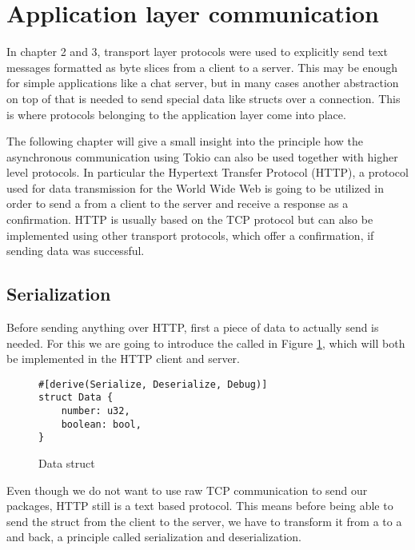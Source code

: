 
\section{Application layer communication}
In chapter 2 and 3, transport layer protocols were used to explicitly send text messages formatted as byte slices from
a client to a server. This may be enough for simple applications like a chat server, but in many cases another
abstraction on top of that is needed to send special data like structs over a connection. This is where protocols
belonging to the application layer come into place.

The following chapter will give a small insight into the principle how the asynchronous communication using Tokio can
also be used together with higher level protocols. In particular the Hypertext Transfer Protocol (HTTP), a protocol
used for data transmission for the World Wide Web is going to be utilized in order to send a  from a
client to the server and receive a response as a confirmation. HTTP is usually based on the TCP protocol but can also
be implemented using other transport protocols, which offer a confirmation, if sending data was successful.

\subsection{Serialization}
Before sending anything over HTTP, first a piece of data to actually send is needed. For this we are going to introduce
the  called  in Figure \ref{data-struct}, which will both be implemented in the HTTP client and
server.

\begin{figure}[ht]
    \begin{verbatim}
#[derive(Serialize, Deserialize, Debug)]
struct Data {
    number: u32,
    boolean: bool,
}
    \end{verbatim}
    \caption{Data struct}
    \label{data-struct}
\end{figure}

Even though we do not want to use raw TCP communication to send our packages, HTTP still is a text based protocol. This
means before being able to send the struct from the client to the server, we have to transform it from a 
to a  and back, a principle called serialization and deserialization.

